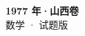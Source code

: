 \documentclass[zihao=-4, a4paper]{ctexart}
\begin{document}
\begin{center}
  {\Large\bfseries 1977 年·山西卷}\\[4pt]
  {\large 数学 · 试题版}
\end{center}
\medskip
{}

\end{document}
